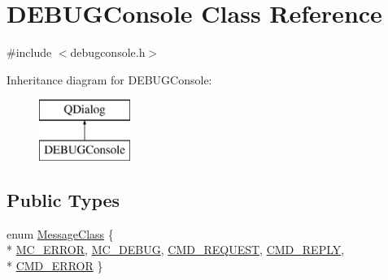 \hypertarget{class_d_e_b_u_g_console}{}\section{D\+E\+B\+U\+G\+Console Class Reference}
\label{class_d_e_b_u_g_console}


{\ttfamily \#include $<$debugconsole.\+h$>$}

Inheritance diagram for D\+E\+B\+U\+G\+Console\+:\begin{figure}[H]
\begin{center}
\leavevmode
\includegraphics[height=2.000000cm]{class_d_e_b_u_g_console}
\end{center}
\end{figure}
\subsection*{Public Types}
\begin{DoxyCompactItemize}
\item 
enum \hyperlink{class_d_e_b_u_g_console_ab4d5228b2f3681131add4278aca4127f}{Message\+Class} \{ \\*
\hyperlink{class_d_e_b_u_g_console_ab4d5228b2f3681131add4278aca4127fa2768f57752c9bf803b24ad8f6a49d52b}{M\+C\+\_\+\+E\+R\+R\+O\+R}, 
\hyperlink{class_d_e_b_u_g_console_ab4d5228b2f3681131add4278aca4127fa62448f948e5d91cbcb8104a84b549ffa}{M\+C\+\_\+\+D\+E\+B\+U\+G}, 
\hyperlink{class_d_e_b_u_g_console_ab4d5228b2f3681131add4278aca4127fa5869851a28d5453b673600a40b42f93c}{C\+M\+D\+\_\+\+R\+E\+Q\+U\+E\+S\+T}, 
\hyperlink{class_d_e_b_u_g_console_ab4d5228b2f3681131add4278aca4127fa4404df69deee7c2e08611e07dde45bcb}{C\+M\+D\+\_\+\+R\+E\+P\+L\+Y}, 
\\*
\hyperlink{class_d_e_b_u_g_console_ab4d5228b2f3681131add4278aca4127fac1e3404266b5c91f0b39be25a1bc714e}{C\+M\+D\+\_\+\+E\+R\+R\+O\+R}
 \}
\end{DoxyCompactItemize}
